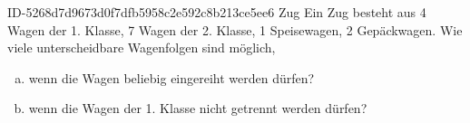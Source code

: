 \begin{exercise}
      {ID-5268d7d9673d0f7dfb5958c2e592c8b213ce5ee6}
      {Zug}
  \ifproblem\problem
    Ein Zug besteht aus 4 Wagen der 1. Klasse, 7 Wagen der 2. Klasse, 1
    Speisewagen, 2 Gepäckwagen. Wie viele unterscheidbare Wagenfolgen sind
    möglich,
    \begin{enumerate}[a)]
      \item wenn die Wagen beliebig eingereiht werden dürfen?
      \item wenn die Wagen der 1. Klasse nicht getrennt werden dürfen?
    \end{enumerate}
  \fi
\end{exercise}
